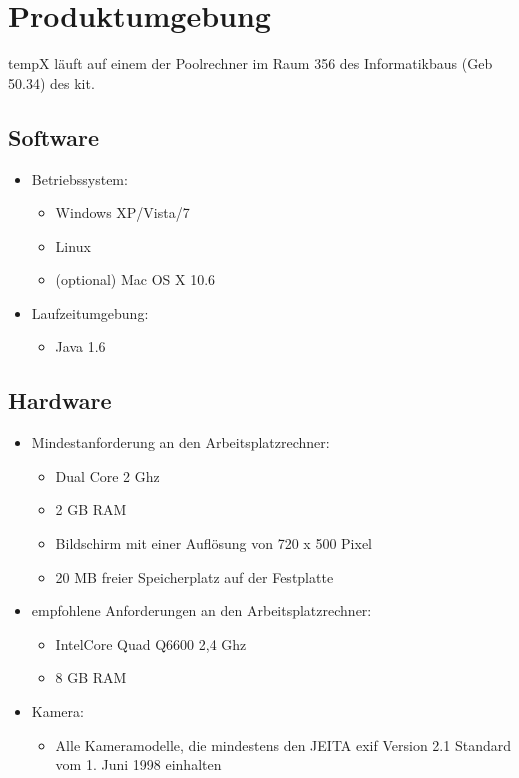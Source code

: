 \section{Produktumgebung}

\gls{tempX} läuft auf einem der Poolrechner im Raum 356 des Informatikbaus (Geb 50.34) des \gls{kit}.

\subsection{Software}

	\begin{itemize}
		
		\item Betriebssystem: 
		\begin{itemize}
			\item Windows XP/Vista/7
			\item Linux
			\item (optional) Mac OS X 10.6
		\end{itemize}
	
		\item Laufzeitumgebung:
		\begin{itemize}
			\item Java 1.6
		\end{itemize}
		
	\end{itemize}
	
\subsection{Hardware}

	\begin{itemize}
		
		\item Mindestanforderung an den Arbeitsplatzrechner: 
		\begin{itemize}
			\item Dual Core 2 Ghz
			\item 2 GB RAM
			\item Bildschirm mit einer Auflösung von 720 x 500 Pixel
			\item 20 MB freier Speicherplatz auf der Festplatte
		\end{itemize}
	
		\item empfohlene Anforderungen an den Arbeitsplatzrechner:
		\begin{itemize}
			\item Intel\textregistered Core Quad Q6600 2,4 Ghz
			\item 8 GB RAM
		\end{itemize}	
	
		\item Kamera:
		\begin{itemize}
			\item Alle Kameramodelle, die mindestens den JEITA \gls{exif} Version 2.1 Standard vom 1. Juni 1998 einhalten
		\end{itemize}
		
	\end{itemize}